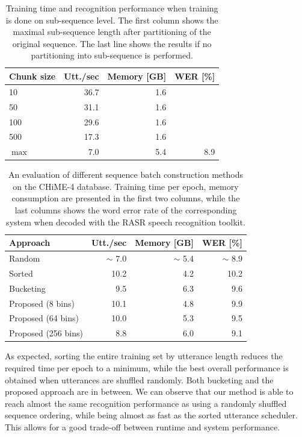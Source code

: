 \documentclass{article}
\begin{document}
	\begin{table}[tbp]
		\centering
		\caption{Training time and recognition performance when training is done 
		on sub-sequence level. The first column shows the maximal sub-sequence length 
		after partitioning of the original sequence. The last line shows the results 
		if no partitioning into sub-sequence is performed. }
		\label{tab:chime:chunk}
		\begin{tabular}{lrrr}
			\hline
			Chunk size              & Utt./sec & Memory [GB] & WER [\%] \\
			\hline
			10     					&	36.7   & 1.6         &			 \\
			50  					&	31.1   & 1.6		 &    		 \\
			100 					& 	29.6   & 1.6		 &			 \\
			500						& 	17.3   & 1.6         &			 \\
			$\max$					&	7.0	   & 5.4         &	8.9		 \\
			\hline
		\end{tabular}
	\end{table}

	\begin{table}[tbp]
		\centering
		\caption{An evaluation of different sequence batch construction methods on the CHiME-4 database. Training time per epoch, memory consumption are presented in the first two columns, while the last columns shows the word error rate of the corresponding system
		when decoded with the RASR speech recognition toolkit.}
		\label{tab:chime:batch}
		\begin{tabular}{lrrr}
			\hline
			Approach                & Utt./sec & Memory [GB] & WER [\%]          \\
			\hline
			Random 					& $\sim$ 7.0     & $\sim$ 5.4		 & $\sim$ 8.9		 \\
			Sorted					& 10.2    &	4.2 & 10.2		 \\
			\hline
			Bucketing				& 9.5     &	6.3		 & 9.6		 \\
			Proposed (8 bins)	    & 10.1	   & 4.8     & 9.9		 \\
			Proposed (64 bins)	    & 10.0     & 5.3     & 9.5		 \\
			Proposed (256 bins)	    & 8.8	   & 6.0     & 9.1		 \\
			\hline
		\end{tabular}
	\end{table}

  As expected, sorting the entire training set by utterance length reduces the required time 
  per epoch to a minimum, while the best overall performance is obtained when utterances are shuffled randomly. Both bucketing and the proposed 
  approach are in between. We can observe that our method is able to reach almost the same recognition performance as using a randomly shuffled sequence
  ordering, while being almost as fast as the sorted utterance scheduler. This allows for a good trade-off between runtime and system performance.
  
\end{document}
